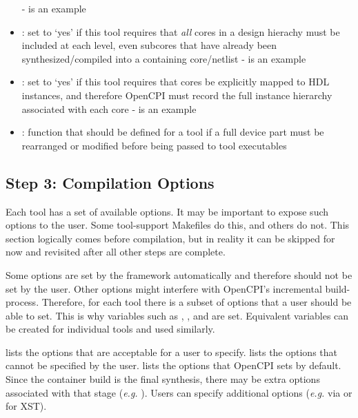 \begin{itemize}
  \subitem -  is an example
\item {}: set to `yes' if this tool requires that \textit{all} cores in a design hierachy must be included at each level, even subcores that have already been synthesized/compiled into a containing core/netlist
  \subitem -  is an example
\item {}: set to `yes' if this tool requires that cores be explicitly mapped to HDL instances, and therefore OpenCPI must record the full instance hierarchy associated with each core
  \subitem -  is an example
\item {}: function that should be defined for a tool if a full device part must be rearranged or modified before being passed to tool executables
\end{itemize}

\subsection{Step 3: Compilation Options}
\label{options}
Each tool has a set of available options. It may be important to expose such options to the user. Some tool-support Makefiles do this, and others do not. This section logically comes before compilation, but in reality it can be skipped for now and revisited after all other steps are complete.\newline

Some options are set by the framework automatically and therefore should not be set by the user. Other options might interfere with OpenCPI's incremental build-process. Therefore, for each tool there is a subset of options that a user should be able to set. This is why variables such as , , and  are set. Equivalent variables can be created for individual tools and used similarly. \newline

 lists the options that are acceptable for a user to specify.  lists the options that cannot be specified by the user.  lists the options that OpenCPI sets by default. Since the container build is the final synthesis, there may be extra options associated with that stage (\textit{e.g.} ). Users can specify additional options (\textit{e.g.} via  or  for XST). \newline

